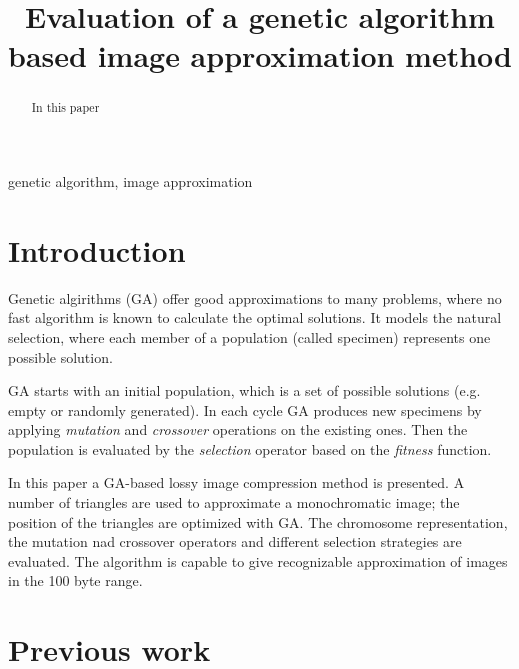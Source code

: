 \documentclass[conference]{IEEEtran}
\begin{document}
\title{Evaluation of a genetic algorithm based image approximation method}

\author{
}

\maketitle

\begin{abstract}
In this paper
\end{abstract}

\begin{IEEEkeywords}
genetic algorithm, image approximation
\end{IEEEkeywords}

\section{Introduction}

Genetic algirithms (GA) \cite{ga-book} offer good approximations to many
problems, where no fast algorithm is known to calculate
the optimal solutions. It models the natural selection,
where each member of a population (called specimen)
represents one possible solution.

GA starts with an initial population, which is a set of
possible solutions (e.g. empty or randomly generated).
In each cycle GA produces new specimens by applying
\emph{mutation} and \emph{crossover} operations on the
existing ones. Then the population is evaluated by
the \emph{selection} operator based on the \emph{fitness}
function.

In this paper a GA-based lossy image compression method is
presented. A number of triangles are used to approximate
a monochromatic image; the position of the triangles are
optimized with GA. The chromosome representation, the
mutation nad crossover operators and different selection
strategies are evaluated. The algorithm is capable to give
recognizable approximation of images in the 100 byte range.

\section{Previous work}
\end{document}

